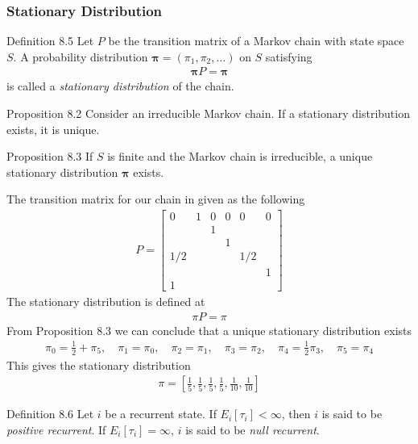 \subsubsection{Stationary Distribution}
\begin{boks}{Definition 8.5}
  Let $P$ be the transition matrix of a Markov chain with state space $S$. A probability distribution $\boldsymbol{\pi} = (\pi_1, \pi_2, \ldots)$ on $S$ satisfying
  \begin{align*}
    \boldsymbol{\pi} P = \boldsymbol{\pi}
  \end{align*}
  is called a \textit{stationary distribution} of the chain.
\end{boks}
\begin{boks}{Proposition 8.2}
  Consider an irreducible Markov chain. If a stationary distribution exists, it is unique.
\end{boks}
\begin{boks}{Proposition 8.3}
  If $S$ is finite and the Markov chain is irreducible, a unique stationary distribution $\boldsymbol{\pi}$ exists.
\end{boks}
The transition matrix for our chain in given as the following
\begin{align*}
  P =
  \begin{bmatrix}
      0 & 1 & 0 & 0 & 0 & 0  \\
        &   & 1 &   &     &  \\
        &   &   & 1 &     &  \\
    1/2 &   &   &   & 1/2 &  \\
        &   &   &   &     &1 \\
    1   &   &   &   &     &
  \end{bmatrix}
\end{align*}
The stationary distribution is defined at
\begin{align*}
  \pi P = \pi
\end{align*}
From Proposition 8.3 we can conclude that a unique stationary distribution exists
\begin{align*}
  \pi_0 = \frac{1}{2} + \pi_5, \quad
  \pi_1 = \pi_0, \quad
  \pi_2 = \pi_1, \quad
  \pi_3 = \pi_2, \quad
  \pi_4 = \frac{1}{2} \pi_3, \quad
  \pi_5 = \pi_4
\end{align*}
This gives the stationary distribution
\begin{align*}
  \pi = \left[\frac{1}{5}, \frac{1}{5}, \frac{1}{5}, \frac{1}{5}, \frac{1}{10}, \frac{1}{10}\right]
\end{align*}
\begin{boks}{Definition 8.6}
  Let $i$ be a recurrent state. If $E_i[\tau_i] < \infty$, then $i$ is said to be \textit{positive recurrent}. If $E_i[\tau_i] = \infty$, $i$ is said to be \textit{null recurrent}.
\end{boks}
